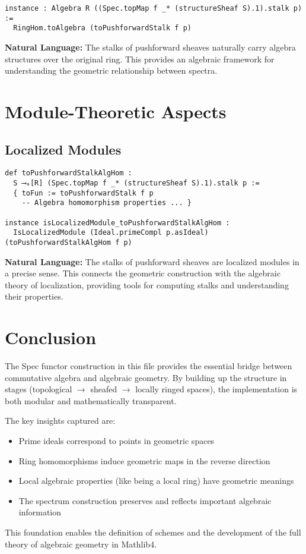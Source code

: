 \documentclass{article}
\theoremstyle{definition}
\begin{document}
\begin{lstlisting}
instance : Algebra R ((Spec.topMap f _* (structureSheaf S).1).stalk p) :=
  RingHom.toAlgebra (toPushforwardStalk f p)
\end{lstlisting}

\textbf{Natural Language:} The stalks of pushforward sheaves naturally carry algebra structures over the original ring. This provides an algebraic framework for understanding the geometric relationship between spectra.

\section{Module-Theoretic Aspects}

\subsection{Localized Modules}

\begin{lstlisting}
def toPushforwardStalkAlgHom :
  S ⟶ₐ[R] (Spec.topMap f _* (structureSheaf S).1).stalk p :=
  { toFun := toPushforwardStalk f p
    -- Algebra homomorphism properties ... }

instance isLocalizedModule_toPushforwardStalkAlgHom :
  IsLocalizedModule (Ideal.primeCompl p.asIdeal) (toPushforwardStalkAlgHom f p)
\end{lstlisting}

\textbf{Natural Language:} The stalks of pushforward sheaves are localized modules in a precise sense. This connects the geometric construction with the algebraic theory of localization, providing tools for computing stalks and understanding their properties.

\section{Conclusion}

The Spec functor construction in this file provides the essential bridge between commutative algebra and algebraic geometry. By building up the structure in stages (topological $\to$ sheafed $\to$ locally ringed spaces), the implementation is both modular and mathematically transparent.

The key insights captured are:
\begin{itemize}
\item Prime ideals correspond to points in geometric spaces
\item Ring homomorphisms induce geometric maps in the reverse direction
\item Local algebraic properties (like being a local ring) have geometric meanings
\item The spectrum construction preserves and reflects important algebraic information
\end{itemize}

This foundation enables the definition of schemes and the development of the full theory of algebraic geometry in Mathlib4.
\end{document}
